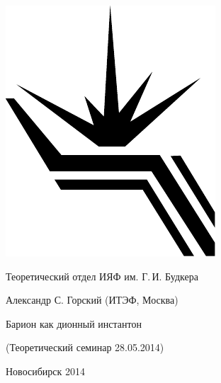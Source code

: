 \documentclass[12pt,pagesize,paper=landscape,paper=192mm:108mm]{scrbook}
\begin{document}
\begin{titlepage}
  \vspace*{-0.5em}
  \begin{center}    
    \hspace*{3em}
    \begin{minipage}[t]{3em}
      \includegraphics[width=\textwidth]{../BINP-logo}
    \end{minipage}\hfill
    Теоретический отдел ИЯФ им. Г.\,И. Будкера\hfill
    \hspace*{7em}
    \bigskip

    \large
    Александр С. Горский  (ИТЭФ, Москва)
    \smallskip

    \Large
    Барион как дионный инстантон
    \bigskip

    \normalsize
    (Теоретический семинар 28.05.2014)
    \vfill

    \normalsize
    \vfill

    \normalsize \ccbysa\hspace{0.5em}  Новосибирск 2014
  \end{center}
\end{titlepage}
\end{document}
